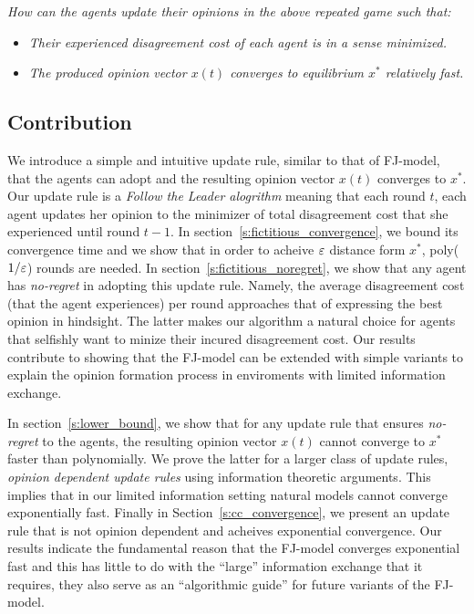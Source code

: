 \emph{How can the agents update their opinions in the above
repeated game such that:}
\begin{itemize}
\item \emph{Their experienced disagreement cost of each agent is in a sense minimized.}
\item \emph{The produced opinion vector $x(t)$ converges to equilibrium $x^*$
 relatively fast.}
\end{itemize}

\subsection{Contribution}
We introduce a simple and intuitive update rule,
similar to that of FJ-model, that the agents can adopt
and the resulting opinion vector $x(t)$ converges to $x^*$.
Our update rule is a \emph{Follow the Leader alogrithm}
meaning that each round $t$, each agent updates her opinion
to the minimizer of total disagreement cost that
she experienced until round $t-1$. In section~\ref{s:fictitious_convergence},
we bound its convergence time and we show that in order
to acheive $\varepsilon$ distance form $x^*$, poly($1/\varepsilon$) rounds
are needed. In section~\ref{s:fictitious_noregret},
we show that any agent has \emph{no-regret} in adopting
this update rule. Namely, the average disagreement cost (that
the agent experiences) per round approaches that
of expressing the best opinion in hindsight. The latter
makes our algorithm a natural choice for agents that
selfishly want to minize their incured disagreement cost.
Our results contribute to showing that the FJ-model
can be extended with simple variants to explain
the opinion formation process in enviroments with limited
information exchange.

In section~\ref{s:lower_bound}, we show
that for any update rule that ensures \emph{no-regret}
to the agents, the resulting opinion vector $x(t)$
cannot converge to $x^*$ faster than polynomially. We
prove the latter for a larger class of update rules,
\emph{opinion dependent update rules} using information
theoretic arguments. This implies that in our limited
information setting natural models cannot converge exponentially
fast. Finally in Section~\ref{s:cc_convergence}, we present
an update rule that is not opinion dependent and acheives exponential
convergence. Our results indicate the fundamental reason that
the FJ-model converges exponential fast and this has little
to do with the \enquote{large} information exchange that it requires,
they also serve as an \enquote{algorithmic guide} for future
variants of the FJ-model.


